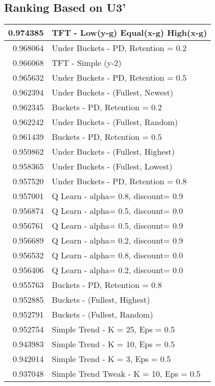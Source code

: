 \begin{table}[!hbtp]
\subsection{Ranking Based on U3'}
\begin{footnotesize}
\begin{tabular}{|r|l|}\hline  \label{U3results}
0.974385 & TFT - Low(y-g) Equal(x-g) High(x-g)\\ \hline
0.968064 & Under Buckets - PD, Retention = 0.2\\ \hline
0.966068 & TFT - Simple (y-2)\\ \hline
0.965632 & Under Buckets - PD, Retention = 0.5\\ \hline
0.962394 & Under Buckets - (Fullest, Newest)\\ \hline
0.962345 & Buckets - PD, Retention = 0.2\\ \hline
0.962242 & Under Buckets - (Fullest, Random)\\ \hline
0.961439 & Buckets - PD, Retention = 0.5\\ \hline
0.959862 & Under Buckets - (Fullest, Highest)\\ \hline
0.958365 & Under Buckets - (Fullest, Lowest)\\ \hline
0.957520 & Under Buckets - PD, Retention = 0.8\\ \hline
0.957001 & Q Learn - alpha= 0.8, discount= 0.9\\ \hline
0.956874 & Q Learn - alpha= 0.5, discount= 0.0\\ \hline
0.956761 & Q Learn - alpha= 0.5, discount= 0.9\\ \hline
0.956689 & Q Learn - alpha= 0.2, discount= 0.9\\ \hline
0.956532 & Q Learn - alpha= 0.8, discount= 0.0\\ \hline
0.956406 & Q Learn - alpha= 0.2, discount= 0.0\\ \hline
0.955763 & Buckets - PD, Retention = 0.8\\ \hline
0.952885 & Buckets - (Fullest, Highest)\\ \hline
0.952791 & Buckets - (Fullest, Random)\\ \hline
0.952754 & Simple Trend - K = 25, Eps = 0.5\\ \hline
0.943983 & Simple Trend - K = 10, Eps = 0.5\\ \hline
0.942014 & Simple Trend - K = 3, Eps = 0.5\\ \hline
0.937048 & Simple Trend Tweak - K = 10, Eps = 0.5\\ \hline

\end{tabular}
\end{footnotesize}
\end{table}
